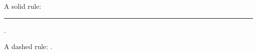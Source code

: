 \documentclass{article}
\begin{document}
A solid rule: \rule{5cm}{1pt}.

A dashed rule: \hdashrule{5cm}{1pt}{3pt}.
\end{document}
